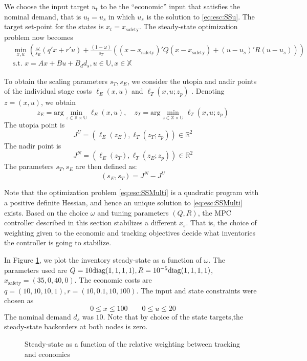 We choose the input target $u_t$ to be the ``economic'' input that
satisfies the nominal demand, that is $u_t = u_s$ in which $u_s$ is
the solution to \eqref{eq:esc:SSu}. The target set-point for the states is
$x_t = x_{\text{safety}}$. The steady-state optimization problem
now becomes
\begin{align}
\label{eq:esc:SSMulti}
&\min_{x,u}{}(\frac{\omega}{s_E} (q'x+r'u) +
\frac{(1-\omega)}{s_T}((x-x_{\text{safety}})'Q(x-x_{\text{safety}})+(u-u_s)'R(u-u_s)))
\nonumber\\
&\text{s.t.~} x=Ax+Bu+B_dd_s, u \in \mathbb{U}, x \in \mathbb{X} 
\end{align}

To obtain the scaling parameters $s_T,s_E$, we consider the utopia and
nadir points of the individual stage costs $\ell_E(x,u)$ and
$\ell_T(x,u;z_p)$ \citep{kim:weck:2005}. Denoting $z = (x,u)$, we obtain
\[ z_E = \text{arg}\min_{z \in \mathbb{X} \times
  \mathbb{U}}{\ell_E(x,u)}, \quad z_T = \text{arg}\min_{z \in \mathbb{X} \times
  \mathbb{U}}{\ell_T(x,u;z_p)} \]
The utopia point is \[J^U = (\ell_E(z_E),\ell_T(z_T;z_p))\in
\mathbb{R}^2\] 
The nadir point is \[J^N = (\ell_E(z_T),\ell_T(z_E;z_p))\in
\mathbb{R}^2 \] 
The parameters $s_T,s_E$ are then defined as:
\[ (s_E,s_T) = J^N-J^U \]

Note that  the optimization problem \eqref{eq:esc:SSMulti} is a quadratic program with a positive
definite Hessian, and hence an unique solution to \eqref{eq:esc:SSMulti}
exists.
Based on the choice $\omega$ and
tuning parameters $(Q,R)$, the MPC controller described in this section stabilizes a different
$x_s$. That is, the choice of weighting given to the economic and
tracking objectives decide what inventories the controller is going to stabilize.


In Figure \ref{fig:esc:SS_omega}, we plot the inventory steady-state as a
function of $\omega$. The parameters used are $ Q =
10\text{diag}{(1,1,1,1)}, R = 10^{-5}\text{diag}{(1,1,1,1)}$, $x_{\text{safety}}
= (35,0,40,0)$. The economic costs are $q = (10,10,10,1), r =
(10,0.1,10,100)$. The input and state constraints were chosen as
\[ 0 \leq x \leq 100 \qquad 0 \leq u \leq 20 \]
The nominal demand
$d_s$ was $10$. Note that by choice of the state targets,the
steady-state backorders at both nodes is zero.

\begin{figure}[h]
\centering
\scriptsize
\resizebox{\textwidth}{!}{}
\caption{Steady-state as a function of the relative weighting between tracking and
  economics}
\label{fig:esc:SS_omega}
\end{figure}

